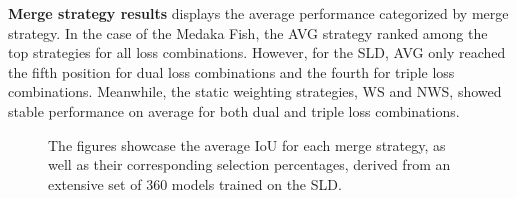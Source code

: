 \textbf{Merge strategy results}\newline
{} displays the average performance categorized by merge strategy. In the case of the Medaka Fish, the AVG strategy ranked among the top strategies for all loss combinations. However, for the \ac{SLD}, AVG only reached the fifth position for dual loss combinations and the fourth for triple loss combinations. Meanwhile, the static weighting strategies, WS and NWS, showed stable performance on average for both dual and triple loss combinations.
\begin{figure}[H]%
  \centering
  \caption[Average IoU for Each Merge Strategy (Skin Lesion)]{The figures showcase the average \ac{IoU} for each merge strategy, as well as their corresponding selection percentages, derived from an extensive set of 360 models trained on the \ac{SLD}.}
  \label{merge_strategy_results_melanoma_short}
\end{figure}
